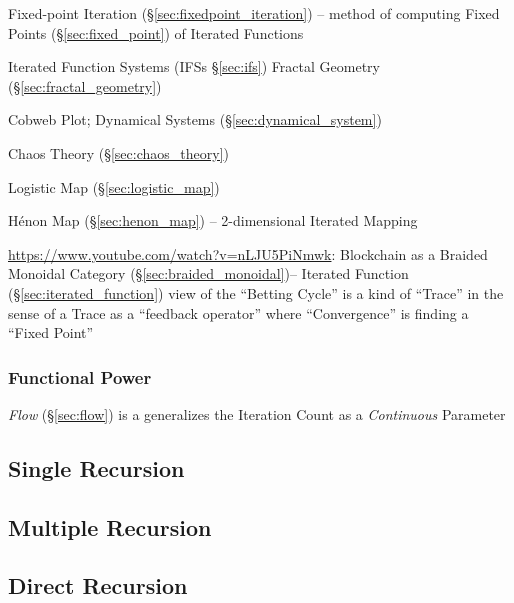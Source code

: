 Fixed-point Iteration (\S\ref{sec:fixedpoint_iteration}) -- method of computing
Fixed Points (\S\ref{sec:fixed_point}) of Iterated Functions

Iterated Function Systems (IFSs \S\ref{sec:ifs}) \fist Fractal Geometry
(\S\ref{sec:fractal_geometry})

Cobweb Plot; \fist Dynamical Systems (\S\ref{sec:dynamical_system})

Chaos Theory (\S\ref{sec:chaos_theory})

Logistic Map (\S\ref{sec:logistic_map})

H\'enon Map (\S\ref{sec:henon_map}) -- 2-dimensional Iterated Mapping

\url{https://www.youtube.com/watch?v=nLJU5PiNmwk}: Blockchain as a Braided
Monoidal Category (\S\ref{sec:braided_monoidal})-- Iterated Function
(\S\ref{sec:iterated_function}) view of the ``Betting Cycle'' is a kind of
``Trace'' in the sense of a Trace as a ``feedback operator'' where
``Convergence'' is finding a ``Fixed Point''



\subsubsection{Functional Power}\label{sec:functional_power}

\emph{Flow} (\S\ref{sec:flow}) is a generalizes the Iteration Count as a
\emph{Continuous} Parameter



\subsection{Single Recursion}\label{sec:single_recursion}

\subsection{Multiple Recursion}\label{sec:multiple_recursion}

\subsection{Direct Recursion}\label{sec:direct_recursion}

